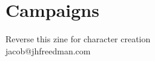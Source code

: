 \documentclass[statementpaper,oneside,article,14pt]{memoir}
\begin{document}
	\section*{Campaigns}
	
	
	
	\newpage
	
	Reverse this zine for character creation
	\\jacob@jhfreedman.com
	
\end{document}
